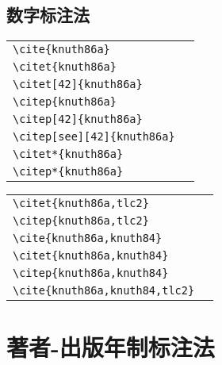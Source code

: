 \subsection{数字标注法}

\noindent
\begin{tabular}{l@{\quad$\Rightarrow$\quad}l}
  \verb|\cite{knuth86a}|              & \cite{knuth86a}              \\
  \verb|\citet{knuth86a}|             & \citet{knuth86a}             \\
  \verb|\citet[42]{knuth86a}|         & \citet[42]{knuth86a}         \\
  \verb|\citep{knuth86a}|             & \citep{knuth86a}             \\
  \verb|\citep[42]{knuth86a}|         & \citep[42]{knuth86a}         \\
  \verb|\citep[see][42]{knuth86a}|    & \citep[see][42]{knuth86a}    \\
  \verb|\citet*{knuth86a}|            & \citet*{knuth86a}            \\
  \verb|\citep*{knuth86a}|            & \citep*{knuth86a}            \\
\end{tabular}
\par{}
\noindent
\begin{tabular}{l@{\quad$\Rightarrow$\quad}l}
  \verb|\citet{knuth86a,tlc2}|        & \citet{knuth86a,tlc2}        \\
  \verb|\citep{knuth86a,tlc2}|        & \citep{knuth86a,tlc2}        \\
  \verb|\cite{knuth86a,knuth84}|      & \cite{knuth86a,knuth84}      \\
  \verb|\citet{knuth86a,knuth84}|     & \citet{knuth86a,knuth84}     \\
  \verb|\citep{knuth86a,knuth84}|     & \citep{knuth86a,knuth84}     \\
  \verb|\cite{knuth86a,knuth84,tlc2}| & \cite{knuth86a,knuth84,tlc2} \\
\end{tabular}



\section{著者-出版年制标注法}

